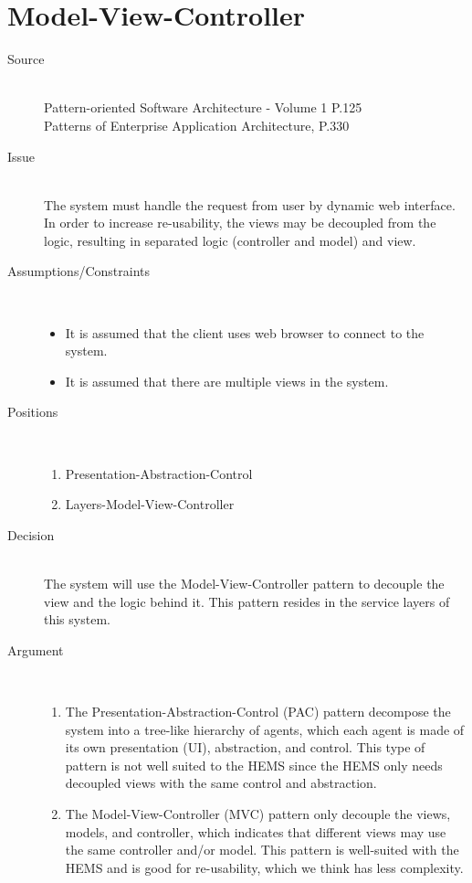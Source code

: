 \section{Model-View-Controller}
\begin{description}
\item [Source]~\\
Pattern-oriented Software Architecture - Volume 1 P.125 \cite{wiley-1}\\
Patterns of Enterprise Application Architecture, P.330 \cite{Fowler:2002:PEA:579257}

\item [Issue]~\\
The system must handle the request from user by dynamic web interface. In order to increase re-usability, the views may be decoupled from the logic, resulting in separated logic (controller and model) and view.

\item [Assumptions/Constraints]~
\begin{itemize}
\item It is assumed that the client uses web browser to connect to the system.
\item It is assumed that there are multiple views in the system.
\end{itemize}


\item [Positions]~
\begin{enumerate}
\item Presentation-Abstraction-Control
\item Layers-Model-View-Controller
\end{enumerate}


\item [Decision] ~\\
The system will use the Model-View-Controller pattern to decouple the view and the logic behind it. This pattern resides in the service layers of this system.

\item [Argument]~
\begin{enumerate}
\item The Presentation-Abstraction-Control (PAC) pattern decompose the system into a tree-like hierarchy of agents, which each agent is made of its own presentation (UI), abstraction, and control. This type of pattern is not well suited to the HEMS since the HEMS only needs decoupled views with the same control and abstraction.

\item The Model-View-Controller (MVC) pattern only decouple the views, models, and controller, which indicates that different views may use the same controller and/or model. This pattern is well-suited with the HEMS and is good for re-usability, which we think has less complexity.


\end{enumerate}
\end{description}
